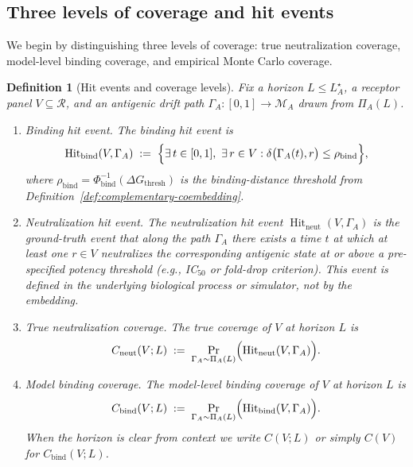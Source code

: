 \documentclass[11pt]{article}
\newcommand{\Hit}{\operatorname{Hit}}
\newtheorem{definition}{Definition}
\begin{document}
\subsection{Three levels of coverage and hit events}

We begin by distinguishing three levels of coverage: true neutralization coverage, model-level
binding coverage, and empirical Monte Carlo coverage.

\begin{definition}[Hit events and coverage levels]
\label{def:coverage-levels}
Fix a horizon $L \le L_A^\star$, a receptor panel $V \subseteq \mathcal{R}$, and an antigenic
drift path $\Gamma_A : [0,1] \to \mathcal{M}_A$ drawn from $\Pi_A(L)$.

\begin{enumerate}
\item \emph{Binding hit event.} The binding hit event is
\[
\Hit_{\mathrm{bind}}(V,\Gamma_A)
\;:=\;
\Bigl\{
\exists\,t \in [0,1],\ \exists\,r \in V :
\delta\bigl(\Gamma_A(t),r\bigr) \le \rho_{\mathrm{bind}}
\Bigr\},
\]
where $\rho_{\mathrm{bind}} = \Phi_{\mathrm{bind}}^{-1}(\Delta G_{\mathrm{thresh}})$ is the binding-distance
threshold from Definition~\ref{def:complementary-coembedding}.

\item \emph{Neutralization hit event.} The neutralization hit event
$\Hit_{\mathrm{neut}}(V,\Gamma_A)$ is the ground-truth event that along the path $\Gamma_A$ there
exists a time $t$ at which at least one $r \in V$ neutralizes the corresponding antigenic state
at or above a pre-specified potency threshold (e.g., IC$_{50}$ or fold-drop criterion). This event
is defined in the underlying biological process or simulator, not by the embedding.

\item \emph{True neutralization coverage.} The \emph{true} coverage of $V$ at horizon $L$ is
\[
C_{\mathrm{neut}}(V;L)
\;:=\;
\Pr_{\Gamma_A \sim \Pi_A(L)}
\Bigl(\Hit_{\mathrm{neut}}(V,\Gamma_A)\Bigr).
\]

\item \emph{Model binding coverage.} The \emph{model-level} binding coverage of $V$ at horizon
$L$ is
\[
C_{\mathrm{bind}}(V;L)
\;:=\;
\Pr_{\Gamma_A \sim \Pi_A(L)}
\Bigl(\Hit_{\mathrm{bind}}(V,\Gamma_A)\Bigr).
\]
When the horizon is clear from context we write $C(V;L)$ or simply $C(V)$ for
$C_{\mathrm{bind}}(V;L)$.
\end{enumerate}
\end{definition}
\end{document}
